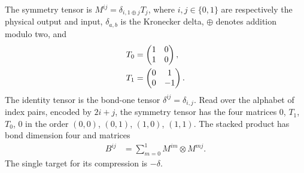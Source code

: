 \begin{definition}
    \label{def:asymex_czx_tensors}
    \leanok
    The symmetry tensor is $M^{ij}=\delta_{i,1\oplus j}T_j$, where
    $i,j\in\{0,1\}$ are respectively the physical output and input,
    $\delta_{a,b}$ is the Kronecker delta, $\oplus$ denotes addition
    modulo two, and
    \begin{align}
        T_0 & =\begin{pmatrix}1&0\\1&0\end{pmatrix},
        \notag                                        \\
        T_1 & =\begin{pmatrix}0&1\\0&-1\end{pmatrix}.
        \notag
    \end{align}
    The identity tensor is the bond-one tensor
    $\delta^{ij}=\delta_{i,j}$. Read over the alphabet of index pairs,
    encoded by $2i+j$, the symmetry tensor has the four matrices
    $0$, $T_1$, $T_0$, $0$ in the order $(0,0)$, $(0,1)$, $(1,0)$, $(1,1)$.
    The stacked product has bond dimension four and matrices
    \begin{align}
        B^{ij} & =\sum_{m=0}^{1}M^{im}\otimes M^{mj}.
        \label{eq:asymex_czx_stack}
    \end{align}
    The single target for its compression is $-\delta$.
\end{definition}

